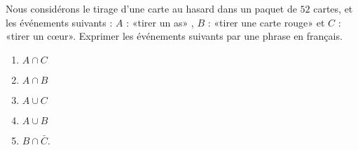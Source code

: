 
\begin{exercice}\label{exosmath-0359}

Nous considérons le tirage d'une carte au hasard dans un paquet de \( 52\) cartes, et les événements suivants : \( A\) : «tirer un as» , \( B\) : «tirer une carte rouge» et \( C\) : «tirer un cœur». Exprimer les événements suivants par une phrase en français.
\begin{multicols}{3}
\begin{enumerate}
    \item
        \( A\cap C\)
    \item
        \( A\cap B\)
    \item
        \( A\cup C\)
    \item
        \( A\cup B\)
    \item
        \( B\cap \bar C\).
\end{enumerate}
\end{multicols}

\end{exercice}
